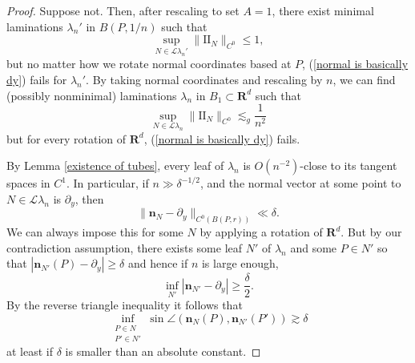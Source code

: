 \documentclass[reqno,11pt]{amsart}
\newcommand{\RR}{\mathbf{R}}
\newcommand{\Leaves}{\mathscr L}
\newcommand{\Two}{\mathrm{I\!I}}
\newcommand{\normal}{\mathbf n}
\newcommand{\inj}{\mathrm{inj}}
\newtheorem{sublemma}[theorem]{Sublemma}
\theoremstyle{definition}
\numberwithin{equation}{section}
\begin{document}
\begin{proof}
	Suppose not.
	Then, after rescaling to set $A = 1$, there exist minimal laminations $\lambda_n'$ in $B(P, 1/n)$ such that
	$$\sup_{N \in \Leaves \lambda_n'} \|\Two_N\|_{C^0} \leq 1,$$
	but no matter how we rotate normal coordinates based at $P$, (\ref{normal is basically dy}) fails for $\lambda_n'$.
	By taking normal coordinates and rescaling by $n$, we can find (possibly nonminimal) laminations $\lambda_n$ in $B_1 \subset \RR^d$ such that
\begin{equation}\label{bounds on Two in representation}
	\sup_{N \in \Leaves \lambda_n} \|\Two_N\|_{C^0} \lesssim_g \frac{1}{n^2}
\end{equation}
	but for every rotation of $\RR^d$, (\ref{normal is basically dy}) fails.



	By Lemma \ref{existence of tubes}, every leaf of $\lambda_n$ is $O(n^{-2})$-close to its tangent spaces in $C^1$.
	In particular, if $n \gg \delta^{-1/2}$, and the normal vector at some point to $N \in \Leaves \lambda_n$ is $\partial_y$, then
	$$\|\normal_N - \partial_y\|_{C^0(B(P, r))} \ll \delta.$$
	We can always impose this for some $N$ by applying a rotation of $\RR^d$.
	But by our contradiction assumption, there exists some leaf $N'$ of $\lambda_n$ and some $P \in N'$ so that $|\normal_{N'}(P) - \partial_y| \geq \delta$ and hence if $n$ is large enough,
	$$\inf_{N'} |\normal_{N'} - \partial_y| \geq \frac{\delta}{2}.$$
	By the reverse triangle inequality it follows that
\begin{equation}\label{discrepancy in normals}
	\inf_{\substack{P \in N\\ P' \in N'}} \sin \angle(\normal_N(P), \normal_{N'}(P')) \gtrsim \delta
\end{equation}
	at least if $\delta$ is smaller than an absolute constant.
	

\end{proof}
\end{document}
